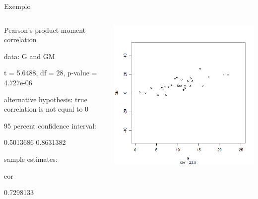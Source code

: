 \documentclass{beamer}
\begin{document}
\begin{frame}{Exemplo}
  \begin{columns}
    \begin{column}{5cm}
      \begin{block}{}
        \tiny
        Pearson's product-moment correlation

        data:  G and GM
        
        t = 5.6488, df = 28, p-value = 4.727e-06
        
        alternative hypothesis: true correlation is not equal to 0
        
        95 percent confidence interval:
        
        0.5013686 0.8631382
        
        sample estimates:
        
        cor
        
        0.7298133
      \end{block}
   \end{column}
    \begin{column}{5cm}
  \begin{center}
    \includegraphics[height=.8\textheight]{Cap17/anim-2}
  \end{center}
    \end{column}
\end{columns}
\end{frame}
\end{document}
